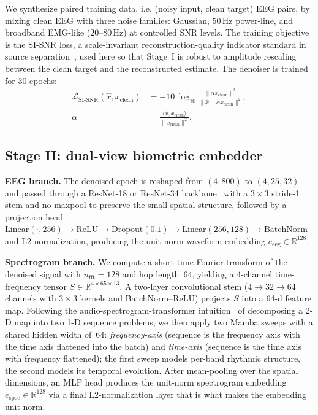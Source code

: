 \documentclass[conference,a4paper]{APSIPA2026}
\begin{document}
We synthesize paired training data, i.e. (noisy input, clean target)
EEG pairs, by mixing clean EEG with three noise families: Gaussian,
$50$\,Hz power-line, and broadband EMG-like ($20$--$80$\,Hz) at
controlled SNR levels. The training objective is the SI-SNR loss, a
scale-invariant reconstruction-quality indicator standard in source
separation~\cite{luo2019tasnet}, used here so that Stage~I is robust
to amplitude rescaling between the clean target and the reconstructed
estimate. The denoiser is trained for $30$ epochs:
\begin{equation}
\begin{aligned}
\mathcal{L}_{\mathrm{SI\text{-}SNR}}(\hat{x},x_{\mathrm{clean}})
&= -10\,\log_{10}\!\frac{\|\alpha x_{\mathrm{clean}}\|^{2}}
{\|\hat{x}-\alpha x_{\mathrm{clean}}\|^{2}},\\
\alpha &= \frac{\langle \hat{x}, x_{\mathrm{clean}}\rangle}
{\|x_{\mathrm{clean}}\|^{2}}.
\end{aligned}
\end{equation}

\subsection{Stage II: dual-view biometric embedder}
\textbf{EEG branch.} The denoised epoch is reshaped from
$(4,800)$ to $(4,25,32)$ and passed through a ResNet-18 or ResNet-34
backbone~\cite{he2016resnet} with a $3{\times}3$ stride-1 stem and no
maxpool to preserve the small spatial structure, followed by a projection
head $\text{Linear}(\cdot,256)\to\text{ReLU}\to\text{Dropout}(0.1)
\to\text{Linear}(256,128)\to\text{BatchNorm}$ and L2 normalization,
producing the unit-norm waveform embedding $e_{\mathrm{eeg}}\in\mathbb{R}^{128}$.

\textbf{Spectrogram branch.} We compute a short-time Fourier transform
of the denoised signal with $n_{\mathrm{fft}}=128$ and hop length~$64$,
yielding a 4-channel time-frequency tensor $S\in\mathbb{R}^{4\times 65\times 13}$.
A two-layer convolutional stem ($4{\to}32{\to}64$ channels with $3{\times}3$
kernels and BatchNorm--ReLU) projects $S$ into a 64-d feature map.
Following the audio-spectrogram-transformer
intuition~\cite{gong2021ast} of decomposing a 2-D map into two 1-D
sequence problems, we then apply two Mamba sweeps with a shared
hidden width of~$64$: \emph{frequency-axis} (sequence is the
frequency axis with the time axis flattened into the batch) and
\emph{time-axis} (sequence is the time axis with frequency
flattened); the first sweep models per-band rhythmic structure, the
second models its temporal evolution. After mean-pooling over the spatial
dimensions, an MLP head produces the unit-norm spectrogram embedding
$e_{\mathrm{spec}}\in\mathbb{R}^{128}$ via a final L2-normalization
layer that is what makes the embedding unit-norm.
\end{document}

